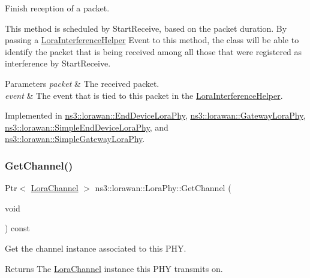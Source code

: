 Finish reception of a packet.

This method is scheduled by Start\+Receive, based on the packet duration. By passing a \hyperlink{classns3_1_1lorawan_1_1LoraInterferenceHelper}{Lora\+Interference\+Helper} Event to this method, the class will be able to identify the packet that is being received among all those that were registered as interference by Start\+Receive.


\begin{DoxyParams}{Parameters}
{\em packet} & The received packet. \\
\hline
{\em event} & The event that is tied to this packet in the \hyperlink{classns3_1_1lorawan_1_1LoraInterferenceHelper}{Lora\+Interference\+Helper}. \\
\hline
\end{DoxyParams}


Implemented in \hyperlink{classns3_1_1lorawan_1_1EndDeviceLoraPhy_af5618e5c03f0010244fcde7922d9899f}{ns3\+::lorawan\+::\+End\+Device\+Lora\+Phy}, \hyperlink{classns3_1_1lorawan_1_1GatewayLoraPhy_a030500acf630f508b12923627cdc4068}{ns3\+::lorawan\+::\+Gateway\+Lora\+Phy}, \hyperlink{classns3_1_1lorawan_1_1SimpleEndDeviceLoraPhy_a03a9d0ffdd5f89991a61aa54e5a1e7ba}{ns3\+::lorawan\+::\+Simple\+End\+Device\+Lora\+Phy}, and \hyperlink{classns3_1_1lorawan_1_1SimpleGatewayLoraPhy_aefb2464599926253bfb1003fa14f8fae}{ns3\+::lorawan\+::\+Simple\+Gateway\+Lora\+Phy}.

\mbox{\label{classns3_1_1lorawan_1_1LoraPhy_a8f6df296dcad3d8b74eb3682625663d2}} 
\subsubsection{\texorpdfstring{Get\+Channel()}{GetChannel()}}
{\footnotesize\ttfamily Ptr$<$ \hyperlink{classns3_1_1lorawan_1_1LoraChannel}{Lora\+Channel} $>$ ns3\+::lorawan\+::\+Lora\+Phy\+::\+Get\+Channel (\begin{DoxyParamCaption}\item[{void}]{ }\end{DoxyParamCaption}) const}

Get the channel instance associated to this P\+HY.

\begin{DoxyReturn}{Returns}
The \hyperlink{classns3_1_1lorawan_1_1LoraChannel}{Lora\+Channel} instance this P\+HY transmits on. 
\end{DoxyReturn}
\mbox{\label{classns3_1_1lorawan_1_1LoraPhy_a2de97ba546889dfe9fdac9deb3de77c3}} 
